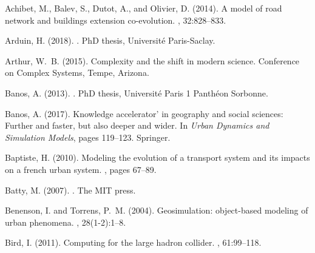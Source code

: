 \documentclass[graybox]{svmult}
\begin{document}

\begin{thebibliography}{}

Achibet, M., Balev, S., Dutot, A., and Olivier, D. (2014).
\newblock A model of road network and buildings extension co-evolution.
, 32:828--833.

Arduin, H. (2018).
.
\newblock PhD thesis, Universit{\'e} Paris-Saclay.

Arthur, W.~B. (2015).
\newblock Complexity and the shift in modern science.
\newblock Conference on Complex Systems, Tempe, Arizona.

Banos, A. (2013).
.
\newblock PhD thesis, Universit{\'e} Paris 1 Panth{\'e}on Sorbonne.

Banos, A. (2017).
\newblock Knowledge accelerator' in geography and social sciences: Further and
  faster, but also deeper and wider.
\newblock In {\em Urban Dynamics and Simulation Models}, pages 119--123.
  Springer.

Baptiste, H. (2010).
\newblock Modeling the evolution of a transport system and its impacts on a
  french urban system.
, pages
  67--89.

Batty, M. (2007).
.
\newblock The MIT press.

Benenson, I. and Torrens, P.~M. (2004).
\newblock Geosimulation: object-based modeling of urban phenomena.
, 28(1-2):1--8.

Bird, I. (2011).
\newblock Computing for the large hadron collider.
, 61:99--118.


\end{thebibliography}
\end{document}
